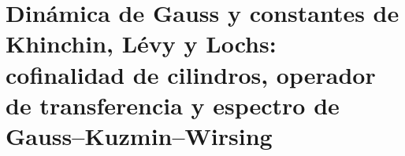 \chapter{Dinámica de Gauss y constantes de Khinchin, Lévy y Lochs: cofinalidad de cilindros, operador de transferencia y espectro de Gauss--Kuzmin--Wirsing}
\label{chap:p3-final:44:gauss_khinchin_levy_lochs}


